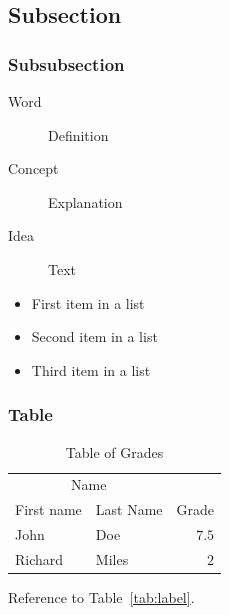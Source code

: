 \documentclass[
10pt, %
a4paper, %
oneside, %
headinclude,footinclude, %
BCOR5mm, %
]{scrartcl}
\begin{document}
\lipsum[10] %


\subsection{Subsection}
\lipsum[11] %

\subsubsection{Subsubsection}

\lipsum[12] %

\begin{description}
\item[Word] Definition
\item[Concept] Explanation
\item[Idea] Text
\end{description}

\lipsum[12] %

\begin{itemize}[noitemsep] %
\item First item in a list
\item Second item in a list
\item Third item in a list
\end{itemize}

\subsubsection{Table}

\lipsum[13] %

\begin{table}[hbt]
\caption{Table of Grades}
\centering
\begin{tabular}{llr}
\toprule
\multicolumn{2}{c}{Name} \\
\cmidrule(r){1-2}
First name & Last Name & Grade \\
\midrule
John & Doe & $7.5$ \\
Richard & Miles & $2$ \\
\bottomrule
\end{tabular}
\label{tab:label}
\end{table}

Reference to Table~\vref{tab:label}. %
\end{document}
